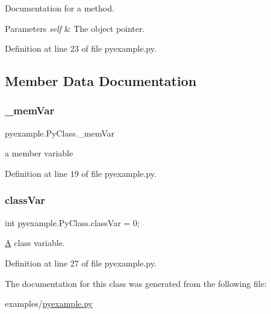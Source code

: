 Documentation for a method. 


\begin{DoxyParams}{Parameters}
{\em self} & The object pointer. \\
\hline
\end{DoxyParams}


Definition at line 23 of file pyexample.\+py.


\begin{DoxyCode}{0}

\end{DoxyCode}


\subsection{Member Data Documentation}
\mbox{\label{classpyexample_1_1_py_class_a9165738cd516769e4fcd274219e9d255}} 
\subsubsection{\texorpdfstring{\_memVar}{\_memVar}}
{\footnotesize\ttfamily pyexample.\+Py\+Class.\+\_\+mem\+Var\hspace{0.3cm}{\ttfamily [private]}}



a member variable 



Definition at line 19 of file pyexample.\+py.

\mbox{\label{classpyexample_1_1_py_class_abd17aff54e5b0ca194020c796c733546}} 
\subsubsection{\texorpdfstring{classVar}{classVar}}
{\footnotesize\ttfamily int pyexample.\+Py\+Class.\+class\+Var = 0;\hspace{0.3cm}{\ttfamily [static]}}



\mbox{\hyperlink{class_a}{A}} class variable. 



Definition at line 27 of file pyexample.\+py.



The documentation for this class was generated from the following file\+:\begin{DoxyCompactItemize}
\item 
examples/\mbox{\hyperlink{pyexample_8py}{pyexample.\+py}}\end{DoxyCompactItemize}
